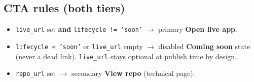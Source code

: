 \documentclass[11pt,a4paper]{article}
\begin{document}
\subsection{CTA rules (both tiers)}
\begin{itemize}
  \item \texttt{live\_url} set \textbf{and} \texttt{lifecycle != 'soon'} $\rightarrow$
        primary \textbf{Open live app}.
  \item \texttt{lifecycle = 'soon'} or \texttt{live\_url} empty $\rightarrow$ disabled
        \textbf{Coming soon} state (never a dead link). \texttt{live\_url} stays optional at
        publish time by design.
  \item \texttt{repo\_url} set $\rightarrow$ secondary \textbf{View repo} (technical page).
\end{itemize}

\end{document}
